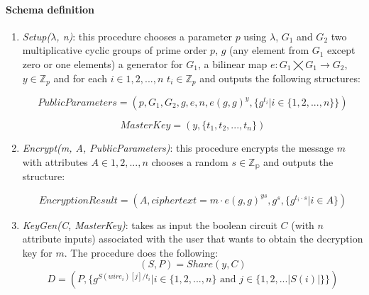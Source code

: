 \documentclass[12pt]{article}
\begin{document}
\paragraph{Schema definition}

\begin{enumerate}
	\item \textit{Setup($\lambda$, n)}: this procedure chooses a parameter $p$ using $\lambda$, $G_1$ and $G_2$ two multiplicative cyclic groups of prime order $p$, $g$ (any element from $G_1$ except zero or one elements) a generator for $G_1$, a bilinear map $e : G_1 \bigtimes G_1 \rightarrow G_2$, $y \in \mathbb{Z}_p$ and for each $i \in {1, 2, ...,n}$ $t_i \in \mathbb{Z}_p$ and outputs the following structures:

	$$PublicParameters = (p, G_1, G_2, g, e, n, e(g, g)^y, \{g^{t_i} | i \in \{1, 2, ..., n\}\})$$

	$$MasterKey = (y, \{t_1, t_2, ..., t_n\})$$

	\item \textit{Encrypt(m, A, PublicParameters)}: this procedure encrypts the message $m$ with attributes $A \in {1, 2, ..., n}$ chooses a random $s \in \mathbb{Z_p}$ and outputs the structure:

	$$EncryptionResult = (A, ciphertext = m \cdot e(g, g)^{ys}, g^s, \{g^{t_i \cdot s} | i \in A\})$$

	\item \textit{KeyGen(C, MasterKey)}: takes as input the boolean circuit $C$ (with $n$ attribute inputs) associated with the user that wants to obtain the decryption key for $m$. The procedure does the following:
		$$(S, P) = Share(y, C)$$
		$$D = (P, \{g^{S(wire_i)[j] / t_i} | i \in \{1, 2, ..., n\} \textrm{ and } j \in \{1, 2, ... |S(i)|\}\})$$


\end{enumerate}
\end{document}
